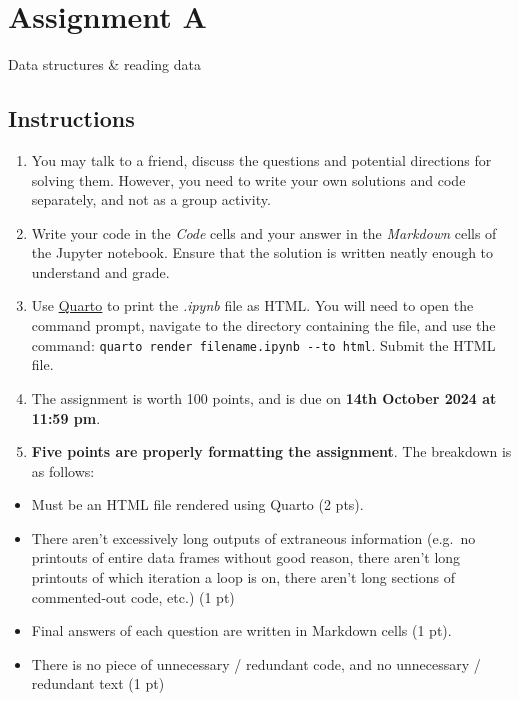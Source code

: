 \documentclass[
  letterpaper,
  DIV=11,
  numbers=noendperiod]{scrreprt}
\providecommand{\tightlist}{%
  \setlength{\itemsep}{0pt}\setlength{\parskip}{0pt}}\usepackage{longtable,booktabs,array}
\begin{document}
\cleardoublepage
{}
{}
\appendix

\hypertarget{assignment-a}{%
\chapter{Assignment A}\label{assignment-a}}

Data structures \& reading data

\hfill\break

\hypertarget{instructions-2}{%
\section*{Instructions}\label{instructions-2}}


\begin{enumerate}
\def\labelenumi{\arabic{enumi}.}
\item
  You may talk to a friend, discuss the questions and potential
  directions for solving them. However, you need to write your own
  solutions and code separately, and not as a group activity.
\item
  Write your code in the \emph{Code} cells and your answer in the
  \emph{Markdown} cells of the Jupyter notebook. Ensure that the
  solution is written neatly enough to understand and grade.
\item
  Use
  \href{https://quarto.org/docs/output-formats/html-basics.html}{Quarto}
  to print the \emph{.ipynb} file as HTML. You will need to open the
  command prompt, navigate to the directory containing the file, and use
  the command: \texttt{quarto\ render\ filename.ipynb\ -\/-to\ html}.
  Submit the HTML file.
\item
  The assignment is worth 100 points, and is due on \textbf{14th October
  2024 at 11:59 pm}.
\item
  \textbf{Five points are properly formatting the assignment}. The
  breakdown is as follows:
\end{enumerate}

\begin{itemize}
\tightlist
\item
  Must be an HTML file rendered using Quarto (2 pts).
\item
  There aren't excessively long outputs of extraneous information
  (e.g.~no printouts of entire data frames without good reason, there
  aren't long printouts of which iteration a loop is on, there aren't
  long sections of commented-out code, etc.) (1 pt)
\item
  Final answers of each question are written in Markdown cells (1 pt).
\item
  There is no piece of unnecessary / redundant code, and no unnecessary
  / redundant text (1 pt)
\end{itemize}
\end{document}
